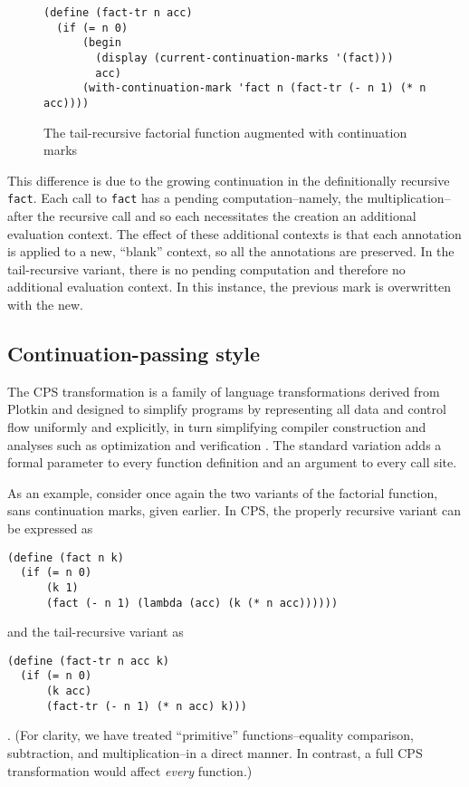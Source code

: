 \documentclass[ms]{byuprop}
\newcounter{definition}
\newcounter{example}
\begin{document}
\begin{figure}
\begin{verbatim}
(define (fact-tr n acc)
  (if (= n 0)
      (begin
        (display (current-continuation-marks '(fact)))
        acc)
      (with-continuation-mark 'fact n (fact-tr (- n 1) (* n acc))))
\end{verbatim}
\caption{The tail-recursive factorial function augmented with continuation marks}
\label{fac-tail-rec-cm}
\end{figure}

This difference is due to the growing continuation in the definitionally recursive
\texttt{fact}. Each call to \texttt{fact} has a pending computation--namely, the
multiplication--after the recursive call and so each necessitates the creation an
additional evaluation context. The effect of these additional contexts is that each
annotation is applied to a new, ``blank'' context, so all the annotations are preserved. 
In the tail-recursive variant, there is no pending computation and therefore no additional
evaluation context. In this instance, the previous mark is overwritten with the new.

\subsection{Continuation-passing style}

The CPS transformation is a family of language transformations derived from Plotkin \cite{plotkin1975call} and designed to simplify  programs by representing all data and control flow uniformly and explicitly, in turn simplifying compiler construction and analyses such as optimization and verification \cite{sabry1994formal}. The standard variation adds a formal parameter to every function definition and an argument to every call site.

As an example, consider once again the two variants of the factorial function, sans continuation 
marks, given earlier. In CPS, the properly recursive variant can be expressed as
\begin{verbatim}
(define (fact n k) 
  (if (= n 0)
      (k 1)
      (fact (- n 1) (lambda (acc) (k (* n acc))))))
\end{verbatim}
and the tail-recursive variant as
\begin{verbatim}
(define (fact-tr n acc k)
  (if (= n 0)
      (k acc)
      (fact-tr (- n 1) (* n acc) k)))
\end{verbatim}. (For clarity, we have treated ``primitive'' functions--equality 
comparison, subtraction, and multiplication--in a direct manner. In contrast, a 
full CPS transformation would affect \emph{every} function.)
\end{document}
